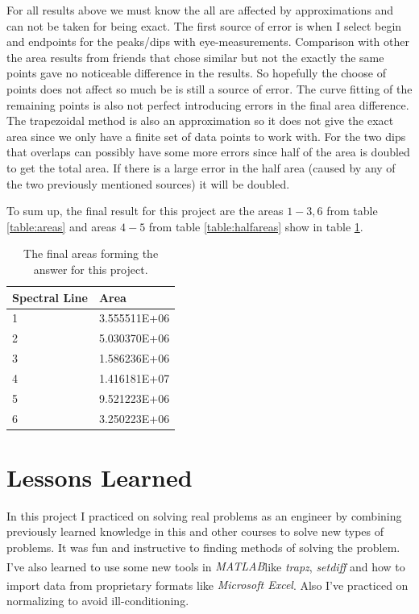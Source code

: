 \documentclass[10pt, a4paper]{article}
\newcommand{\matlab}{\small{\emph{MATLAB\textsuperscript{\textregistered}}}}
\newcommand{\excel}{\emph{Microsoft Excel\textsuperscript{\textregistered}}}
\begin{document}
For all results above we must know the all are affected by approximations and can not be taken for being exact. The first source of error is when I select begin and endpoints for the peaks/dips with eye-measurements. Comparison with other the area results from friends that chose similar but not the exactly the same points gave no noticeable difference in the results. So hopefully the choose of points does not affect so much be is still a source of error. The curve fitting of the remaining points is also not perfect introducing errors in the final area difference. The trapezoidal method is also an approximation so it does not give the exact area since we only have a finite set of data points to work with. For the two dips that overlaps can possibly have some more errors since half of the area is doubled to get the total area. If there is a large error in the half area (caused by any of the two previously mentioned sources) it will be doubled.

To sum up, the final result for this project are the areas $1-3, 6$ from table \ref{table:areas} and areas $4-5$ from table \ref{table:halfareas} show in table \ref{table:finalareas}.


\begin{table}[h]
\begin{center}
\begin{tabular}{l | l}
Spectral Line & Area \\ \hline
1   & 3.555511E+06 \\
2   & 5.030370E+06 \\
3   & 1.586236E+06 \\
4   & 1.416181E+07 \\
5   & 9.521223E+06 \\
6   & 3.250223E+06
\end{tabular}
\end{center}
\caption{The final areas forming the answer for this project.}
\label{table:finalareas}
\end{table}

\section{Lessons Learned}
In this project I practiced on solving real problems as an engineer by combining previously learned knowledge in this and other courses to solve new types of problems. It was fun and instructive to finding methods of solving the problem. I've also learned to use some new tools in \matlab like \emph{trapz}, \emph{setdiff} and how to import data from proprietary formats like \excel. Also I've practiced on normalizing to avoid ill-conditioning.
\end{document}

